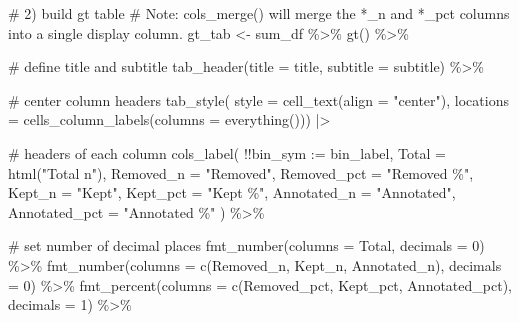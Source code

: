 \documentclass[
  man]{apa7}
\newenvironment{Shaded}{\begin{snugshade}}{\end{snugshade}}
\newcommand{\AttributeTok}[1]{\textcolor[rgb]{0.40,0.45,0.13}{#1}}
\newcommand{\CommentTok}[1]{\textcolor[rgb]{0.37,0.37,0.37}{#1}}
\newcommand{\DecValTok}[1]{\textcolor[rgb]{0.68,0.00,0.00}{#1}}
\newcommand{\FunctionTok}[1]{\textcolor[rgb]{0.28,0.35,0.67}{#1}}
\newcommand{\NormalTok}[1]{\textcolor[rgb]{0.00,0.23,0.31}{#1}}
\newcommand{\OtherTok}[1]{\textcolor[rgb]{0.00,0.23,0.31}{#1}}
\newcommand{\SpecialCharTok}[1]{\textcolor[rgb]{0.37,0.37,0.37}{#1}}
\newcommand{\StringTok}[1]{\textcolor[rgb]{0.13,0.47,0.30}{#1}}
\begin{document}
\begin{Shaded}
\begin{Highlighting}[]
  \CommentTok{\# 2) build gt table}
  \CommentTok{\# Note: cols\_merge() will merge the *\_n and *\_pct columns into a single display column.}
\NormalTok{  gt\_tab }\OtherTok{\textless{}{-}}\NormalTok{ sum\_df }\SpecialCharTok{\%\textgreater{}\%}
    \FunctionTok{gt}\NormalTok{() }\SpecialCharTok{\%\textgreater{}\%}
    
    \CommentTok{\# define title and subtitle}
    \FunctionTok{tab\_header}\NormalTok{(}\AttributeTok{title =}\NormalTok{ title, }\AttributeTok{subtitle =}\NormalTok{ subtitle) }\SpecialCharTok{\%\textgreater{}\%}
    
    \CommentTok{\# center column headers}
    \FunctionTok{tab\_style}\NormalTok{(}
      \AttributeTok{style =} \FunctionTok{cell\_text}\NormalTok{(}\AttributeTok{align =} \StringTok{"center"}\NormalTok{),}
      \AttributeTok{locations =} \FunctionTok{cells\_column\_labels}\NormalTok{(}\AttributeTok{columns =} \FunctionTok{everything}\NormalTok{())) }\SpecialCharTok{|\textgreater{}}
    
    \CommentTok{\# headers of each column}
    \FunctionTok{cols\_label}\NormalTok{(}
      \SpecialCharTok{!!}\AttributeTok{bin\_sym   :=}\NormalTok{ bin\_label,}
      \AttributeTok{Total       =} \FunctionTok{html}\NormalTok{(}\StringTok{"Total n"}\NormalTok{),}
      \AttributeTok{Removed\_n   =} \StringTok{"Removed"}\NormalTok{,}
      \AttributeTok{Removed\_pct =} \StringTok{"Removed \%"}\NormalTok{,}
      \AttributeTok{Kept\_n      =} \StringTok{"Kept"}\NormalTok{,}
      \AttributeTok{Kept\_pct    =} \StringTok{"Kept \%"}\NormalTok{, }
      \AttributeTok{Annotated\_n =} \StringTok{"Annotated"}\NormalTok{, }
      \AttributeTok{Annotated\_pct =} \StringTok{"Annotated \%"}
\NormalTok{    ) }\SpecialCharTok{\%\textgreater{}\%}
    
    \CommentTok{\# set number of decimal places}
    \FunctionTok{fmt\_number}\NormalTok{(}\AttributeTok{columns =}\NormalTok{ Total, }\AttributeTok{decimals =} \DecValTok{0}\NormalTok{) }\SpecialCharTok{\%\textgreater{}\%}
    \FunctionTok{fmt\_number}\NormalTok{(}\AttributeTok{columns =} \FunctionTok{c}\NormalTok{(Removed\_n, Kept\_n, Annotated\_n), }\AttributeTok{decimals =} \DecValTok{0}\NormalTok{) }\SpecialCharTok{\%\textgreater{}\%}
    \FunctionTok{fmt\_percent}\NormalTok{(}\AttributeTok{columns =} \FunctionTok{c}\NormalTok{(Removed\_pct, Kept\_pct, Annotated\_pct), }\AttributeTok{decimals =} \DecValTok{1}\NormalTok{) }\SpecialCharTok{\%\textgreater{}\%}
    

\end{Highlighting}
\end{Shaded}
\end{document}
